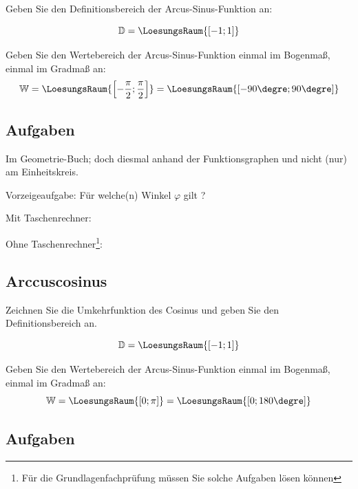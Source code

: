 Geben Sie den Definitionsbereich der Arcus-Sinus-Funktion an:

$$\mathbb{D} = \LoesungsRaum{\left[-1; 1\right]}$$

Geben Sie den Wertebereich der Arcus-Sinus-Funktion einmal im Bogenmaß,
einmal im Gradmaß an:
$$\mathbb{W} = \LoesungsRaum{\left[-\frac{\pi}{2}; \frac{\pi}{2}\right]}  =  \LoesungsRaum{[-90\degre; 90\degre]}$$
\newpage


\subsection*{Aufgaben}

Im Geometrie-Buch; doch diesmal anhand der Funktionsgraphen und nicht (nur) am Einheitskreis.

Vorzeigeaufgabe: Für welche(n) Winkel $\varphi$ gilt \fbox{$\sin(\varphi) = -\sin(-41.7\degre)$}?


\trigsysDsin{}

Mit Taschenrechner:


Ohne Taschenrechner\footnote{Für die Grundlagenfachprüfung müssen Sie solche Aufgaben lösen können}:



\newpage

\subsection{Arccuscosinus}
Zeichnen Sie die Umkehrfunktion des Cosinus und geben Sie den Definitionsbereich an.



$$\mathbb{D} = \LoesungsRaum{[-1; 1]}$$

Geben Sie den Wertebereich der Arcus-Sinus-Funktion einmal im Bogenmaß,
einmal im Gradmaß an:
$$\mathbb{W} = \LoesungsRaum{[0; \pi]}  =  \LoesungsRaum{[0; 180\degre]}$$

\subsection*{Aufgaben}


